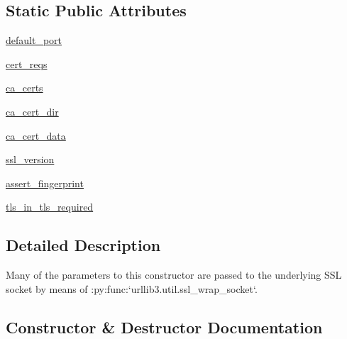 \subsection*{Static Public Attributes}
\begin{DoxyCompactItemize}
\item 
\hyperlink{classpip_1_1__vendor_1_1urllib3_1_1connection_1_1HTTPSConnection_a61f362633d1bc9d40c294c21a61f8b20}{default\+\_\+port}
\item 
\hyperlink{classpip_1_1__vendor_1_1urllib3_1_1connection_1_1HTTPSConnection_af7891dace530290c3d8796fd8831b266}{cert\+\_\+reqs}
\item 
\hyperlink{classpip_1_1__vendor_1_1urllib3_1_1connection_1_1HTTPSConnection_a237b115a60eb50c584c6efeb5a895972}{ca\+\_\+certs}
\item 
\hyperlink{classpip_1_1__vendor_1_1urllib3_1_1connection_1_1HTTPSConnection_ae3fc06ad970069c653c2c46569c0a7fd}{ca\+\_\+cert\+\_\+dir}
\item 
\hyperlink{classpip_1_1__vendor_1_1urllib3_1_1connection_1_1HTTPSConnection_a155b4f9af7c7e7d12a507905f76650c7}{ca\+\_\+cert\+\_\+data}
\item 
\hyperlink{classpip_1_1__vendor_1_1urllib3_1_1connection_1_1HTTPSConnection_afe4074fafce7d280c336a78a7680d2f9}{ssl\+\_\+version}
\item 
\hyperlink{classpip_1_1__vendor_1_1urllib3_1_1connection_1_1HTTPSConnection_ad2a8a52fca402c891f3d8db125925a18}{assert\+\_\+fingerprint}
\item 
\hyperlink{classpip_1_1__vendor_1_1urllib3_1_1connection_1_1HTTPSConnection_a54d65957afded127f42e2139ba46173d}{tls\+\_\+in\+\_\+tls\+\_\+required}
\end{DoxyCompactItemize}


\subsection{Detailed Description}
\begin{DoxyVerb}Many of the parameters to this constructor are passed to the underlying SSL
socket by means of :py:func:`urllib3.util.ssl_wrap_socket`.
\end{DoxyVerb}
 

\subsection{Constructor \& Destructor Documentation}
\mbox{\label{classpip_1_1__vendor_1_1urllib3_1_1connection_1_1HTTPSConnection_af3bb4c182db13b9acd0bbe704dcc6fb4}} 
